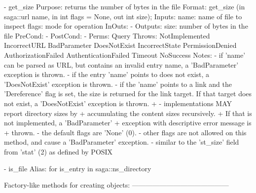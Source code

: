 \begin{myspec}
    - get_size
      Purpose:  returns the number of bytes in the file
      Format:   get_size           (in  saga::url name,
                                    in  int       flags = None,
                                    out int       size);
      Inputs:   name:               name of file to inspect
                flags:              mode for operation
      InOuts:   -
      Outputs:  size:               number of bytes in the file
      PreCond:  -
      PostCond: - 
      Perms:    Query
      Throws:   NotImplemented
                IncorrectURL
                BadParameter
                DoesNotExist
                IncorrectState
                PermissionDenied
                AuthorizationFailed
                AuthenticationFailed
                Timeout
                NoSuccess
      Notes:    - if 'name' can be parsed as URL, but contains 
                  an invalid entry name, a 'BadParameter'
                  exception is thrown.
                - if the entry 'name' points to does not exist, 
                  a 'DoesNotExist' exception is thrown.
                - if the 'name' points to a link and the 
                  'Dereference' flag is set, the size is 
                  returned for the link target.  If that target 
                  does not exist, a 'DoesNotExist' exception is 
                  thrown.
+               - implementations MAY report directory sizes by
+                 accumulating the content sizes recursively.  
+                 If that is not implemented, a 'BadParameter' 
+                 exception with descriptive error message is 
+                 thrown.
                - the default flags are 'None' (0).
                - other flags are not allowed on this method, 
                  and cause a 'BadParameter' exception.
                - similar to the 'st_size' field from 'stat' (2)
                  as defined by POSIX
 
    - is_file
      Alias:    for is_entry in saga::ns_directory
 
 
    Factory-like methods for creating objects:
    ------------------------------------------
 

\end{myspec}
